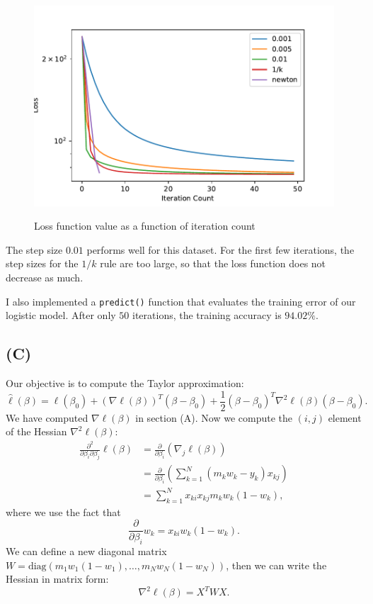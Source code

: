 \documentclass[a4paper,11pt]{article}
\begin{document}
\begin{figure}[!h]
\caption{Loss function value as a function of iteration count}
\centering
\includegraphics[width = \textwidth]{fig_logit}
\label{fig:results}
\end{figure}

The step size $0.01$ performs well for this dataset. For the first few iterations, the step sizes for the $1/k$ rule are too large, so that the loss function does not decrease as much.

I also implemented a \texttt{predict()} function that evaluates the training error of our logistic model. After only $50$ iterations, the training accuracy is $94.02\%$. 

\subsection{(C)}
Our objective is to compute the Taylor approximation:
$$
\hat{\ell}(\beta) = \ell(\beta_0)+(\nabla \ell(\beta))^T(\beta-\beta_0) + \frac{1}{2}(\beta-\beta_0)^T \nabla^2 \ell(\beta) (\beta-\beta_0).
$$
We have computed $\nabla \ell(\beta)$ in section (A). Now we compute the $(i,j)$ element of the Hessian $\nabla^2 \ell(\beta)$:
\begin{align}
		\frac{\partial^2}{\partial \beta_i \partial \beta _j}\ell (\beta) 
		&= \frac{\partial}{\partial \beta_i} \left ( \nabla_j \ell(\beta) \right ) \\
		&= \frac{\partial}{\partial \beta_i} \left ( \sum_{k=1}^N(m_kw_k-y_k)x_{kj} \right )  \\
		&= \sum_{k=1}^{N} x_{ki}x_{kj}m_k w_k(1-w_k),
	\end{align}
where we use the fact that 
$$
		\frac{\partial}{\partial \beta_i} w_k = x_{ki} w_k(1-w_k).
$$
We can define a new diagonal matrix $W = \text{diag}(m_1w_1(1-w_1),\ldots, m_Nw_N(1-w_N))$, then we can write the Hessian in matrix form:
$$
\nabla^2 \ell(\beta) = X^TWX.
$$
\end{document}
